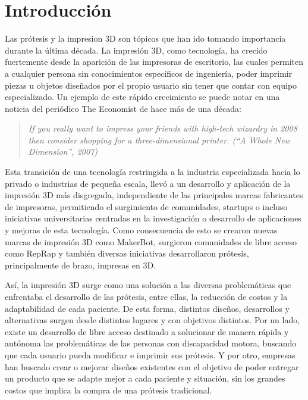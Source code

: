 \chapter{Introducción}

Las prótesis y la impresion 3D son tópicos que han ido tomando importancia durante la última década. La impresión 3D, como tecnología, ha crecido fuertemente desde la aparición de las impresoras de escritorio, las cuales permiten a cualquier persona sin conocimientos específicos de ingeniería, poder imprimir piezas u objetos diseñados por el propio usuario sin tener que contar con equipo especializado. Un ejemplo de este rápido crecimiento se puede notar en una noticia del periódico The Economist de hace más de una década: 

\begin{quote}
\textit{If you really want to impress your friends with high-tech wizardry in 2008 then consider shopping for a three-dimensional printer. (``A Whole New Dimension'', 2007)}
\end{quote}


Esta transición de una tecnología restringida a la industria especializada hacia lo privado o industrias de pequeña escala, llevó a un desarrollo y aplicación de la impresión 3D más disgregada, independiente de las principales marcas fabricantes de impresoras, permitiendo el surgimiento de comunidades, startups o incluso iniciativas universitarias centradas en la investigación o desarrollo de aplicaciones y mejoras de esta tecnología. Como consecuencia de esto se crearon nuevas marcas de impresión 3D como MakerBot, surgieron comunidades de libre acceso como RepRap y también diversas iniciativas desarrollaron prótesis, principalmente de brazo, impresas en 3D.

Así, la impresión 3D surge como una solución a las diversas problemáticas que enfrentaba el desarrollo de las prótesis, entre ellas, la reducción de costos y la adaptabilidad de cada paciente. De esta forma, distintos diseños, desarrollos y alternativas surgen desde distintos lugares y con objetivos distintos. Por un lado, existe un desarrollo de libre acceso destinado a solucionar de manera rápida y autónoma las problemáticas de las personas con discapacidad motora, buscando que cada usuario pueda modificar e imprimir sus prótesis. Y por otro, empresas han buscado crear o mejorar diseños existentes con el objetivo de poder entregar un producto que se adapte mejor a cada paciente y situación, sin los grandes costos que implica la compra de una prótesis tradicional.

